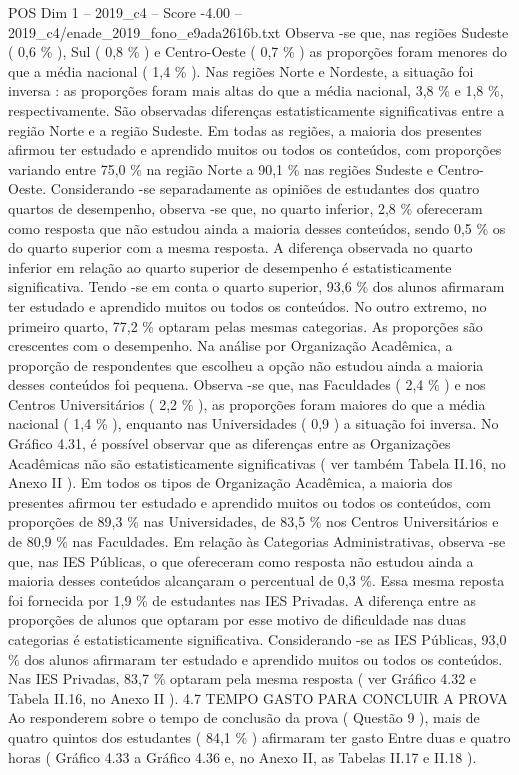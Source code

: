 \begin{textsample}{POS Dim 1 – 2019\_c4 – Score -4.00 – 2019\_c4/enade\_2019\_fono\_e9ada2616b.txt}
Observa -se que, nas regiões Sudeste ( 0,6 \% ), Sul ( 0,8 \% ) e Centro-Oeste ( 0,7 \% ) as proporções foram menores do que a média nacional ( 1,4 \% ).
Nas regiões Norte e Nordeste, a situação foi inversa : as proporções foram mais altas do que a média nacional, 3,8 \% e 1,8 \%, respectivamente.
São observadas diferenças estatisticamente significativas entre a região Norte e a região Sudeste.
Em todas as regiões, a maioria dos presentes afirmou ter estudado e aprendido muitos ou todos os conteúdos, com proporções variando entre 75,0 \% na região Norte a 90,1 \% nas regiões Sudeste e Centro-Oeste.
Considerando -se separadamente as opiniões de estudantes dos quatro quartos de desempenho, observa -se que, no quarto inferior, 2,8 \% ofereceram como resposta que não estudou ainda a maioria desses conteúdos, sendo 0,5 \% os do quarto superior com a mesma resposta.
A diferença observada no quarto inferior em relação ao quarto superior de desempenho é estatisticamente significativa.
Tendo -se em conta o quarto superior, 93,6 \% dos alunos afirmaram ter estudado e aprendido muitos ou todos os conteúdos.
No outro extremo, no primeiro quarto, 77,2 \% optaram pelas mesmas categorias.
As proporções são crescentes com o desempenho.
Na análise por Organização Acadêmica, a proporção de respondentes que escolheu a opção não estudou ainda a maioria desses conteúdos foi pequena.
Observa -se que, nas Faculdades ( 2,4 \% ) e nos Centros Universitários ( 2,2 \% ), as proporções foram maiores do que a média nacional ( 1,4 \% ), enquanto nas Universidades ( 0,9 ) a situação foi inversa.
No Gráfico 4.31, é possível observar que as diferenças entre as Organizações Acadêmicas não são estatisticamente significativas ( ver também Tabela II.16, no Anexo II ).
Em todos os tipos de Organização Acadêmica, a maioria dos presentes afirmou ter estudado e aprendido muitos ou todos os conteúdos, com proporções de 89,3 \% nas Universidades, de 83,5 \% nos Centros Universitários e de 80,9 \% nas Faculdades.
Em relação às Categorias Administrativas, observa -se que, nas IES Públicas, o que ofereceram como resposta não estudou ainda a maioria desses conteúdos alcançaram o percentual de 0,3 \%.
Essa mesma reposta foi fornecida por 1,9 \% de estudantes nas IES Privadas.
A diferença entre as proporções de alunos que optaram por esse motivo de dificuldade nas duas categorias é estatisticamente significativa.
Considerando -se as IES Públicas, 93,0 \% dos alunos afirmaram ter estudado e aprendido muitos ou todos os conteúdos.
Nas IES Privadas, 83,7 \% optaram pela mesma resposta ( ver Gráfico 4.32 e Tabela II.16, no Anexo II ). 4.7 TEMPO GASTO PARA CONCLUIR A PROVA Ao responderem sobre o tempo de conclusão da prova ( Questão 9 ), mais de quatro quintos dos estudantes ( 84,1 \% ) afirmaram ter gasto Entre duas e quatro horas ( Gráfico 4.33 a Gráfico 4.36 e, no Anexo II, as Tabelas II.17 e II.18 ).

\end{textsample}
